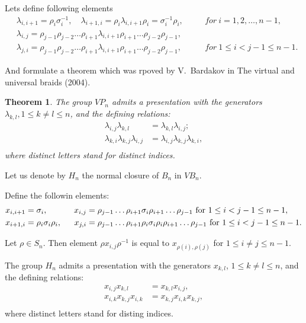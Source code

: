 \documentclass{article}
\newtheorem{theorem}{Theorem}
\begin{document}
Lets define following elements
\begin{align*}
&\lambda_{i, i+1} = \rho_i\sigma_i^{-1}, \quad \lambda_{i+1,i}=\rho_i\lambda_{i,i+1}\rho_i = \sigma_i^{-1}\rho_i, \quad &&for ~ i = 1,2,\dots,n-1,\\
&\lambda_{i,j} = \rho_{j-1}\rho_{j-2}\dots\rho_{i+1}\lambda_{i,i+1}\rho_{i+1}\dots\rho_{j-2}\rho_{j-1},\\
&\lambda_{j,i} = \rho_{j-1}\rho_{j-2}\dots\rho_{i+1}\lambda_{i,i+1}\rho_{i+1}\dots\rho_{j-2}\rho_{j-1}, \quad &&for ~ 1 \le i < j-1 \le n-1.
\end{align*}

And formulate a theorem which was rpoved by V.~Bardakov in 
The virtual and universal braids (2004).

\begin{theorem}
	The group $VP_n$ admits a presentation with the generators $\lambda_{k,l}, 1 \le k \not= l \le n$, and the defining relations:
	\begin{align*}
	\lambda_{i,j}\lambda_{k,l} &= \lambda_{k,l}\lambda_{i,j}; \\
	\lambda_{k,i}\lambda_{k,j}\lambda_{i,j} &= \lambda_{i,j}\lambda_{k,j}\lambda_{k,i}, \\
	\end{align*}
	where distinct letters stand for distinct indices.
\end{theorem}

Let us denote by $H_n$ the normal closure of $B_n$ in $VB_n$.

Define the followin elements: 
\begin{align*}
x_{i,i+1}&=\sigma_i, ~~& x_{i,j}&=\rho_{j-1}\ldots \rho_{i+1}\sigma_i\rho_{i+1}\ldots \rho_{j-1} ~{\rm for}~ 1\le i<j-1\le n-1,\\
x_{i+1,i}&=\rho_i\sigma_i\rho_i, ~~& x_{j,i}&=\rho_{j-1}\ldots \rho_{i+1}\rho_i\sigma_i\rho_i\rho_{i+1}\ldots \rho_{j-1} ~{\rm for}~ 1\le i<j-1\le n-1.\\
\end{align*}


\begin{lemma}
	Let $\rho \in S_n$. Then element $\rho x_{i,j}\rho^{-1}$ is equal to $x_{\rho(i),\rho(j)}$ for $1\le i\ne j\le n-1$.
\end{lemma}


\begin{lemma}
	The group $H_n$ admits a presentation with the generators $x_{k,l}$, $1\le k\ne l\le n$, and the defining relations:
	\begin{align*}
	x_{i,j}x_{k,l}&=x_{k,l}x_{i,j},\\
	x_{i,k}x_{k,j}x_{i,k}&=x_{k,j}x_{i,k}x_{k,j},\\
	\end{align*}
	where distinct letters stand for disting indices.
\end{lemma}
\end{document}
